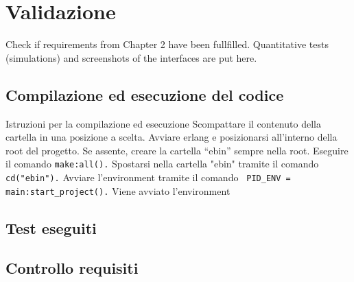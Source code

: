 
\chapter{Validazione}

Check if requirements from Chapter 2 have been fullfilled. Quantitative tests (simulations) and screenshots of the interfaces are put here.

\section{Compilazione ed esecuzione del codice}

Istruzioni per la compilazione ed esecuzione
Scompattare il contenuto della cartella in una posizione a scelta. 
Avviare erlang e posizionarsi all'interno della root del progetto. 
Se assente, creare la cartella ``ebin'' sempre nella root.
Eseguire il comando
\lstinline|make:all().|
Spostarsi nella cartella "ebin" tramite il comando
\lstinline|cd("ebin").|
Avviare l'environment tramite il comando
\lstinline| PID_ENV = main:start_project().|
Viene avviato l'environment 


\section{Test eseguiti}

\section{Controllo requisiti}